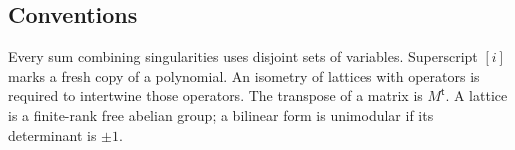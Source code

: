 \subsection*{Conventions}

Every sum combining singularities uses disjoint sets of variables.
Superscript $[i]$ marks a fresh copy of a polynomial. An isometry of
lattices with operators is required to intertwine those operators.
The transpose of a matrix is $M^{\mathsf t}$. A lattice is a finite-rank
free abelian group; a bilinear form is unimodular if its determinant is
$\pm1$.
